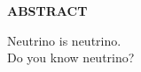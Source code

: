 
%
%

\begin{center}
	{\LARGE\bfseries ABSTRACT}
\end{center}
\vs\hs Neutrino is neutrino.\\
Do you know neutrino?
\thispagestyle{empty}
\clearpage
